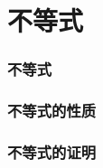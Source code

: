 \chapter{不等式}
\subsection{不等式}
\begin{Practice}
  \begin{question}
    \item 
    \item 
    \item 
  \end{question}
\end{Practice}

\subsection{不等式的性质}
\begin{Practice}
  \begin{question}
    \item 
    \item 
    \item 
  \end{question}
\end{Practice}

\subsection{不等式的证明}
\begin{Practice}
  \begin{question}
    \item 
    \item 
    \item 
    \item 
  \end{question}
\end{Practice}

\begin{Practice}
  \begin{question}
    \item 
    \item 
    \item 
  \end{question}
\end{Practice}

\begin{Practice}
  \begin{question}
    \item 
    \item 
    \item 
  \end{question}
\end{Practice}

